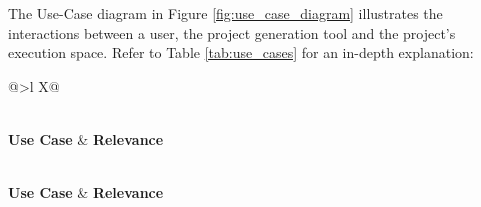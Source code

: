 The Use-Case diagram in Figure \ref{fig:use_case_diagram} illustrates the interactions between a user, the project generation tool and the project's execution space.
Refer to Table \ref{tab:use_cases} for an in-depth explanation:

\begin{xltabular}{\linewidth}{@{}>{\bfseries}l X@{}}
	\caption{Automated CoreMark Benchmarking\label{tab:use_cases}} \\
	\toprule
	\textbf{Use Case} & \textbf{Relevance} \\
	\midrule
	\endfirsthead %
	
	 \\
	\toprule
	\textbf{Use Case} & \textbf{Relevance} \\
	\midrule
	\endhead %
	
	\midrule
	 \\
	\endfoot %
	
	\bottomrule
	\endlastfoot %
	

\end{xltabular}
